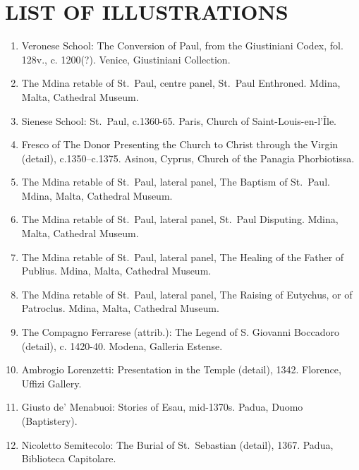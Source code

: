\documentclass[a4paper,12pt]{article}
\begin{document}
\newpage

\section{LIST OF ILLUSTRATIONS}

\begin{enumerate}

\item %
Veronese School: The Conversion of Paul, from the Giustiniani Codex,
fol. 128v., c. 1200(?).  Venice, Giustiniani Collection.

\item %
The Mdina retable of St.~Paul, centre panel, St.~Paul Enthroned.
Mdina, Malta, Cathedral Museum.

\item %
Sienese School: St.~Paul, c.1360-65.  Paris, Church of
Saint-Louis-en-l'\^Ile.

\item %
Fresco of The Donor Presenting the Church to Christ through the Virgin
(detail), c.1350--c.1375.  Asinou, Cyprus, Church of the Panagia
Phorbiotissa.

\item %
The Mdina retable of St.~Paul, lateral panel, The Baptism of St.~Paul.
Mdina, Malta, Cathedral Museum.

\item %
The Mdina retable of St.~Paul, lateral panel, St.~Paul Disputing.
Mdina, Malta, Cathedral Museum.

\item %
The Mdina retable of St.~Paul, lateral panel, The Healing of the
Father of Publius.  Mdina, Malta, Cathedral Museum.

\item %
The Mdina retable of St.~Paul, lateral panel, The Raising of Eutychus,
or of Patroclus.  Mdina, Malta, Cathedral Museum.

\item %
The Compagno Ferrarese (attrib.): The Legend of S. Giovanni Boccadoro
(detail), c. 1420-40.  Modena, Galleria Estense.

\item %
Ambrogio Lorenzetti: Presentation in the Temple (detail), 1342.
Florence, Uffizi Gallery.

\item %
Giusto de' Menabuoi: Stories of Esau, mid-1370s.  Padua, Duomo
(Baptistery).

\item %
Nicoletto Semitecolo: The Burial of St.~Sebastian (detail), 1367.
Padua, Biblioteca Capitolare.


\end{enumerate}
\end{document}
